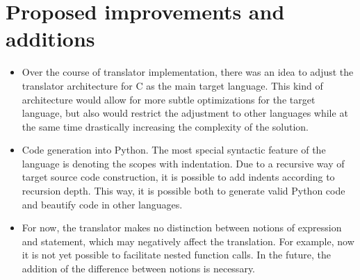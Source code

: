 \section{Proposed improvements and additions}
\begin{itemize}
    \item Over the course of translator implementation, there was an idea to adjust the translator architecture for C as the main target language. This kind of architecture would allow for more subtle optimizations for the target language, but also would restrict the adjustment to other languages while at the same time drastically increasing the complexity of the solution.
    \item Code generation into Python. The most special syntactic feature of the language is denoting the scopes with indentation. Due to a recursive way of target source code construction, it is possible to add indents according to recursion depth. This way, it is possible both to generate valid Python code and beautify code in other languages.
    \item For now, the translator makes no distinction between notions of expression and statement, which may negatively affect the translation. For example, now it is not yet possible to facilitate nested function calls. In the future, the addition of the difference between notions is necessary.
\end{itemize}